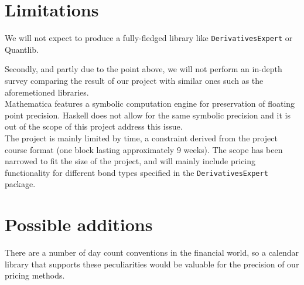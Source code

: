 \documentclass[11pt]{article}
\newcommand{\comm}[2]{{\sf \(\spadesuit\){\bf #1: }{\rm \sf #2}\(\spadesuit\)}}
\newcommand{\mcomm}[2]{\marginpar{\scriptsize \comm{#1}{#2}}}
\newcommand{\ab}[1]{\mcomm{AB}{#1}}
\begin{document}
\section*{Limitations}

We will not expect to produce a fully-fledged library like {\tt DerivativesExpert} or Quantlib\cite{Ame2003}.

Secondly, and partly due to the point above, we will not perform an in-depth survey
comparing the result of our project with similar ones such as the aforemetioned libraries.\\




Mathematica features a symbolic computation engine for preservation of floating point precision. Haskell
does not allow for the same symbolic precision and it is out of the scope of this project address this issue.\\

The project is mainly limited by time, a constraint derived from the project course 
format (one block lasting approximately 9 weeks).
The scope has been narrowed to fit the size of the project, and will mainly include
pricing functionality for different bond types specified in the {\tt DerivativesExpert} package.

\section*{Possible additions}

There are a number of day count conventions in the financial world, so a
calendar library that supports these peculiarities would be valuable for the precision
of our pricing methods.\\

\end{document}
